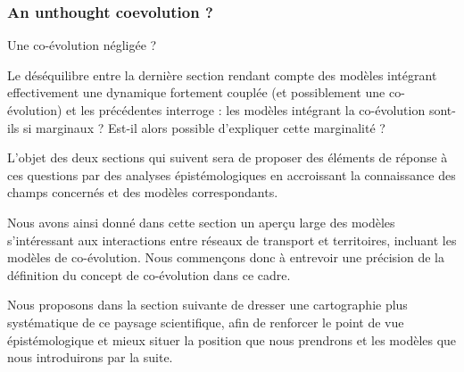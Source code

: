 \subsubsection*{An unthought coevolution ?}{Une co-évolution négligée ?}

Le déséquilibre entre la dernière section rendant compte des modèles intégrant effectivement une dynamique fortement couplée (et possiblement une co-évolution) et les précédentes interroge : les modèles intégrant la co-évolution sont-ils si marginaux ? Est-il alors possible d'expliquer cette marginalité ?


L'objet des deux sections qui suivent sera de proposer des éléments de réponse à ces questions par des analyses épistémologiques en accroissant la connaissance des champs concernés et des modèles correspondants.





\stars


Nous avons ainsi donné dans cette section un aperçu large des modèles s'intéressant aux interactions entre réseaux de transport et territoires, incluant les modèles de co-évolution. Nous commençons donc à entrevoir une précision de la définition du concept de co-évolution dans ce cadre.

Nous proposons dans la section suivante de dresser une cartographie plus systématique de ce paysage scientifique, afin de renforcer le point de vue épistémologique et mieux situer la position que nous prendrons et les modèles que nous introduirons par la suite.


\stars







